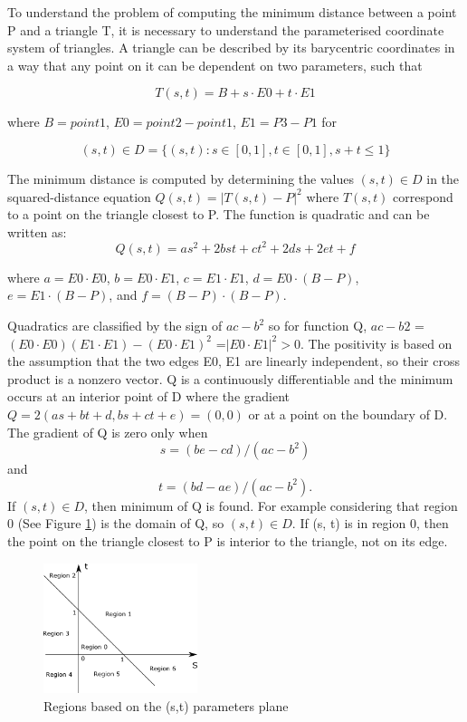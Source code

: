 To understand the problem of computing the minimum distance between a point P and a triangle T, it is necessary to understand the parameterised coordinate system of triangles. A triangle can be described by its barycentric coordinates in a way that any point on it can be dependent on two parameters, such that 

$$T(s, t) = B + s \cdot E0 + t \cdot E1$$

where $B = point1$, $E0 = point2-point1$, $E1 = P3 - P1$ for 

$$(s,t) \in D = \{(s,t) : s \in [0,1],t \in [0,1],s + t ≤ 1\}$$ 

The minimum distance is computed by determining the values $(s, t) \in D$ in the squared-distance equation $Q(s, t) = |T(s, t) - P|^2$ where $T(s,t)$ correspond to a point on the triangle closest to P. The function is quadratic and can be written as: 
$$Q(s,t)=as^2 +2bst+ct^2 +2ds+2et+f$$

where $a = E0 \cdot E0$, $b = E0 \cdot E1$, $c = E1 \cdot E1$, $d = E0 \cdot (B - P)$, $e = E1 \cdot (B - P)$, and $f = (B - P) \cdot (B - P)$.

Quadratics are classified by the sign of $ac - b^2$ so for function Q, $ac - b2$ = $(E0 \cdot E0)(E1 \cdot E1) - (E0 \cdot E1)^2$ =$|E0 \cdot E1|^2 >0$. The positivity is based on the assumption that the two edges E0, E1 are linearly independent, so their cross product is a nonzero vector. Q is a continuously differentiable and the minimum occurs at an interior point of D where the gradient $Q = 2(as + bt + d, bs + ct + e) = (0, 0)$ or at a point on the boundary of D. The gradient of Q is zero only when 
$$s = (be - cd)/(ac - b^2)$$ and 
$$t = (bd - ae)/(ac - b^2).$$ 
If $(s,t) \in D$, then minimum of Q is found. For example considering that region 0 (See Figure \ref{fig10}) is the domain of Q, so $(s, t) \in D$. If (s, t) is in region 0, then the point on the triangle closest to P is interior to the triangle, not on its edge.

\begin{figure}[!h]
\centering
\includegraphics[width=0.4\textwidth]{sketches/pt_regions} \protect\caption{\label{fig10} Regions based on the (s,t) parameters plane}
\end{figure} 

